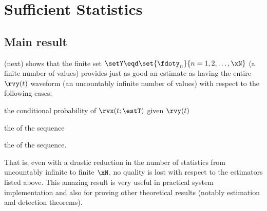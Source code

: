 \chapter{Sufficient Statistics}
\section{Main result}
 (next) shows that the finite set
$\setY\eqd\set{\fdoty_n}{n=1,2,\ldots,\xN}$ (a finite number of values) provides just as
good an estimate as having the entire $\rvy(t)$ waveform
(an uncountably infinite number of values)
with respect to the following cases:
\begin{enume}
   \item the conditional probability of $\rvx(t;\estT)$ given $\rvy(t)$
   \item the  of the sequence
   \item the   of the sequence.
\end{enume}
That is, even with a drastic reduction in the number of statistics
from uncountably infinite to finite $\xN$,
no quality is lost with respect to the estimators listed above.
This amazing result is very useful in practical system implementation
and also for proving other theoretical results
(notably estimation and detection theorems).

